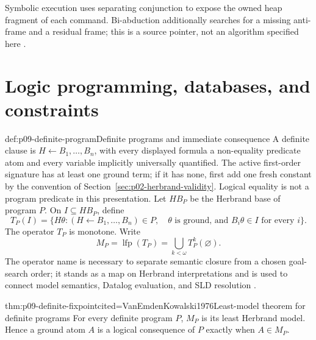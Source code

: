 Symbolic execution uses separating conjunction to expose the owned heap
fragment of each command.  Bi-abduction additionally searches for a missing
anti-frame and a residual frame; this is a source pointer, not an algorithm
specified here \cite{CalcagnoDistefanoOHearnYang2009,OHearn2007}.





\section{Logic programming, databases, and constraints}
\label{sec:p09-logic-programming}

\begin{hbdefinition}{def:p09-definite-program}{Definite programs and immediate consequence}
A definite clause is \(H\leftarrow B_1,\ldots,B_n\), with every displayed
formula a non-equality predicate atom and every variable implicitly universally
quantified.  The active first-order signature has at least one ground term; if
it has none, first add one fresh constant by the convention of
Section~\ref{sec:p02-herbrand-validity}.  Logical equality is not a program
predicate in this presentation.  Let
\(\mathit{HB}_P\) be the Herbrand base of program \(P\).  On
\(I\subseteq\mathit{HB}_P\), define
\[
 T_P(I)=\{H\theta:(H\leftarrow B_1,\ldots,B_n)\in P,\quad
   \theta\text{ is ground, and }B_i\theta\in I\text{ for every }i\}.
\]
The operator \(T_P\) is monotone.  Write
\[
 M_P=\operatorname{lfp}(T_P)
     =\bigcup_{k<\omega}T_P^k(\varnothing).
\]
The operator name is necessary to separate semantic closure from a chosen
goal-search order; it stands as a map on Herbrand interpretations and is used
to connect model semantics, Datalog evaluation, and SLD resolution
\cite{Kowalski1974,VanEmdenKowalski1976}.
\end{hbdefinition}

\begin{hbtheorem}{thm:p09-definite-fixpoint}{cited=VanEmdenKowalski1976}{Least-model theorem for definite programs}
For every definite program \(P\), \(M_P\) is its least Herbrand model.  Hence a
ground atom \(A\) is a logical consequence of \(P\) exactly when
\(A\in M_P\).
\end{hbtheorem}

